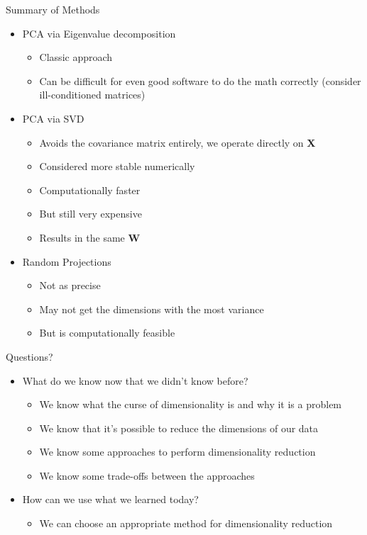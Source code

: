 \documentclass[aspectratio=169]{beamer}
\begin{document}
\begin{frame}{Summary of Methods}

\begin{itemize}
\item PCA via Eigenvalue decomposition
\begin{itemize}
\item Classic approach
\item Can be difficult for even good software to do the math correctly (consider ill-conditioned matrices)
\end{itemize}
\item  PCA via SVD 
\begin{itemize}
\item Avoids the covariance matrix entirely, we operate directly on \textbf{X}
\item Considered more stable numerically
\item Computationally faster
\item But still very expensive
\item Results in the same \textbf{W}
\end{itemize}
\item Random Projections
\begin{itemize}
\item Not as precise
\item May not get the dimensions with the most variance
\item But is computationally feasible
\end{itemize}
\end{itemize}
\end{frame}

\begin{frame}{Questions?}
\begin{itemize}
	\item What do we know now that we didn't know before?
\begin{itemize}
	\item We know what the curse of dimensionality is and why it is a problem
	\item We know that it's possible to reduce the dimensions of our data
	\item We know some approaches to perform dimensionality reduction
	\item We know some trade-offs between the approaches
\end{itemize}

	\item How can we use what we learned today?
\begin{itemize}
	\item We can choose an appropriate method for dimensionality reduction
	\end{itemize}
\end{itemize}
\end{frame}
\end{document}
